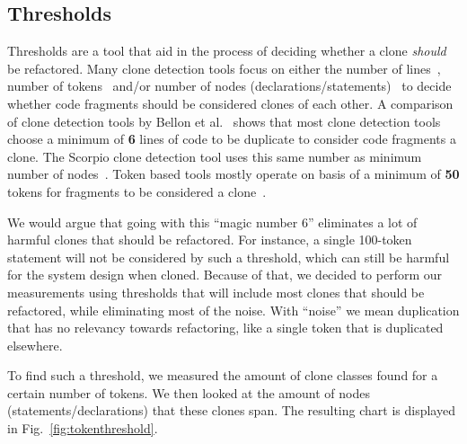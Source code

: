 \documentclass[a4paper]{article}
\begin{document}
\subsection{Thresholds}\label{chap:thresholds}
Thresholds are a tool that aid in the process of deciding whether a clone \textit{should} be refactored. Many clone detection tools focus on either the number of lines~\cite{kamiya2002ccfinder, svajlenko2016bigcloneeval}, number of tokens~\cite{roy2008nicad, sajnani2016sourcerercc, ragkhitwetsagul2019siamese} and/or number of nodes (declarations/statements)~\cite{higo2013revisiting} to decide whether code fragments should be considered clones of each other. A comparison of clone detection tools by Bellon et al.~\cite{bellon2007comparison} shows that most clone detection tools choose a minimum of \textbf{6} lines of code to be duplicate to consider code fragments a clone. The Scorpio clone detection tool uses this same number as minimum number of nodes~\cite{higo2013revisiting}. Token based tools mostly operate on basis of a minimum of \textbf{50} tokens for fragments to be considered a clone~\cite{sajnani2016sourcerercc}.

We would argue that going with this ``magic number 6'' eliminates a lot of harmful clones that should be refactored. For instance, a single 100-token statement will not be considered by such a threshold, which can still be harmful for the system design when cloned. Because of that, we decided to perform our measurements using thresholds that will include most clones that should be refactored, while eliminating most of the noise. With ``noise'' we mean duplication that has no relevancy towards refactoring, like a single token that is duplicated elsewhere.

To find such a threshold, we measured the amount of clone classes found for a certain number of tokens. We then looked at the amount of nodes (statements/declarations) that these clones span. The resulting chart is displayed in Fig.~\ref{fig:tokenthreshold}.
\end{document}
